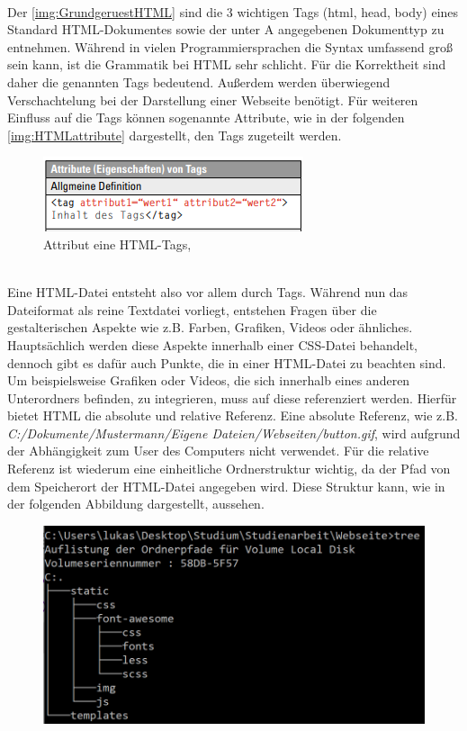 \documentclass[a4paper,titlepage,halfparskip,12pt]{scrreprt}
\begin{document}
\begin{onehalfspacing}
\\Der \autoref{img:GrundgeruestHTML} sind die 3 wichtigen Tags (html, head, body) eines Standard \ac{HTML}-Dokumentes sowie der unter A angegebenen Dokumenttyp zu entnehmen. Während in vielen Programmiersprachen die Syntax umfassend groß sein kann, ist die Grammatik bei HTML sehr schlicht. Für die Korrektheit sind daher die genannten Tags bedeutend. Außerdem werden überwiegend Verschachtelung bei der Darstellung einer Webseite benötigt. Für weiteren Einfluss auf die Tags können sogenannte Attribute, wie in der folgenden \autoref{img:HTMLattribute} dargestellt, den Tags zugeteilt werden. 
\begin{figure}[h]
	\centering
	\includegraphics[scale=2.5]{images/HTMLattribute}
	\caption{Attribut eine \ac{HTML}-Tags, \cite{buhler2017html5}}
	\label{img:HTMLattribute}
\end{figure}
\\Eine \ac{HTML}-Datei entsteht also vor allem durch Tags. Während nun das Dateiformat als reine Textdatei vorliegt, entstehen Fragen über die gestalterischen Aspekte wie z.B. Farben, Grafiken, Videos oder ähnliches. Hauptsächlich werden diese Aspekte innerhalb einer \ac{CSS}-Datei behandelt, dennoch gibt es dafür auch Punkte, die in einer \ac{HTML}-Datei zu beachten sind. Um beispielsweise Grafiken oder Videos, die sich innerhalb eines anderen Unterordners befinden, zu integrieren, muss auf diese referenziert werden. Hierfür bietet \ac{HTML} die absolute und relative Referenz. Eine absolute Referenz, wie z.B. \textit{C:/Dokumente/Mustermann/Eigene Dateien/Webseiten/button.gif}, wird aufgrund der Abhängigkeit zum User des Computers nicht verwendet. Für die relative Referenz ist wiederum eine einheitliche Ordnerstruktur wichtig, da der Pfad von dem Speicherort der \ac{HTML}-Datei angegeben wird. Diese Struktur kann, wie in der folgenden Abbildung dargestellt, aussehen.
\begin{figure}[h]
	\centering
	\includegraphics[scale=0.8]{images/TreeHTMLStruktur}

\end{figure}
\end{onehalfspacing}
\end{document}

